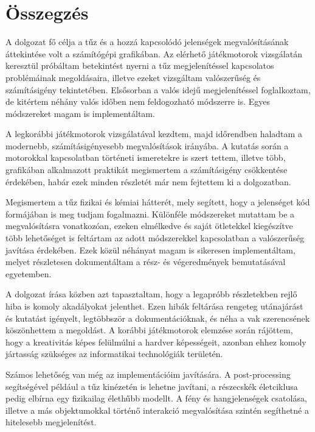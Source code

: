 \documentclass[12pt,a4paper]{report}
\begin{document}
\section*{Összegzés}


A dolgozat fő célja a tűz és a hozzá kapcsolódó jelenségek megvalósításának áttekintése volt a számítógépi grafikában. Az elérhető játékmotorok vizsgálatán keresztül próbáltam betekintést nyerni a tűz megjelenítéssel kapcsolatos problémáinak megoldásaira, illetve ezeket vizsgáltam valószerűség és számításigény tekintetében. Elsősorban a valós idejű megjelenítéssel foglalkoztam, de kitértem néhány valós időben nem feldogozható módszerre is. Egyes módszereket magam is implementáltam.

A legkorábbi játékmotorok vizsgálatával kezdtem, majd időrendben haladtam a modernebb, számításigényesebb megvalósítások irányába. A kutatás során a motorokkal kapcsolatban történeti ismeretekre is szert tettem, illetve több, grafikában alkalmazott praktikát megismertem a számításigény csökkentése érdekében, habár ezek minden részletét már nem fejtettem ki a dolgozatban. 

Megismertem a tűz fizikai és kémiai hátterét, mely segített, hogy a jelenséget kód formájában is meg tudjam fogalmazni. Különféle módszereket mutattam be a megvalósításra vonatkozóan, ezeken elmélkedve és saját ötletekkel kiegészítve több lehetőséget is feltártam az adott módszerekkel kapcsolatban a valószerűség javítása érdekében.
Ezek közül néhányat magam is sikeresen implementáltam, melyet részletesen dokumentáltam a rész- és végeredmények bemutatásával egyetemben. 

A dolgozat írása közben azt tapasztaltam, hogy a legapróbb részletekben rejlő hiba is komoly akadályokat jelenthet. Ezen hibák feltárása rengeteg utánajárást és kutatást igényelt, legtöbbször a dokumentációknak, és néha a vak szerencsének köszönhettem a megoldást. A korábbi játékmotorok elemzése során rájöttem, hogy a kreativitás képes felülmúlni a hardver képességeit, azonban ehhez komoly jártasság szükséges az informatikai technológiák területén. 


Számos lehetőség van még az implementációim javítására. A post-processing segítségével például a tűz kinézetén is lehetne javítani, a részecskék életciklusa pedig elbírna egy fizikailag élethűbb modellt. A fény és hangjelenségek csatolása, illetve a más objektumokkal történő interakció megvalósítása szintén segíthetné a hitelesebb megjelenítést. 
\end{document}
